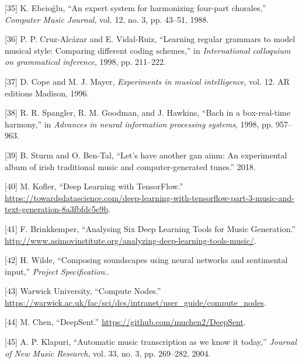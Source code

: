 \documentclass[12pt,]{article}
\begin{document}
\leavevmode\hypertarget{ref-ebciouglu1988expert}{}%
{[}35{]} K. Ebcioğlu, ``An expert system for harmonizing four-part
chorales,'' \emph{Computer Music Journal}, vol. 12, no. 3, pp. 43--51,
1988.

\leavevmode\hypertarget{ref-cruz1998learning}{}%
{[}36{]} P. P. Cruz-Alcázar and E. Vidal-Ruiz, ``Learning regular
grammars to model musical style: Comparing different coding schemes,''
in \emph{International colloquium on grammatical inference}, 1998, pp.
211--222.

\leavevmode\hypertarget{ref-cope1996experiments}{}%
{[}37{]} D. Cope and M. J. Mayer, \emph{Experiments in musical
intelligence}, vol. 12. AR editions Madison, 1996.

\leavevmode\hypertarget{ref-spangler1998bach}{}%
{[}38{]} R. R. Spangler, R. M. Goodman, and J. Hawkins, ``Bach in a
box-real-time harmony,'' in \emph{Advances in neural information
processing systems}, 1998, pp. 957--963.

\leavevmode\hypertarget{ref-sturm2018let}{}%
{[}39{]} B. Sturm and O. Ben-Tal, ``Let's have another gan ainm: An
experimental album of irish traditional music and computer-generated
tunes.'' 2018.

\leavevmode\hypertarget{ref-mkofler}{}%
{[}40{]} M. Kofler, ``Deep Learning with TensorFlow.'' \\
\url{https://towardsdatascience.com/deep-learning-with-tensorflow-part-3-music-and-text-generation-8a3fbfdc5e9b}.

\leavevmode\hypertarget{ref-asimovinst}{}%
{[}41{]} F. Brinkkemper, ``Analysing Six Deep Learning Tools for Music
Generation.'' \\
\url{http://www.asimovinstitute.org/analyzing-deep-learning-tools-music/}.

\leavevmode\hypertarget{ref-specification}{}%
{[}42{]} H. Wilde, ``Composing soundscapes using neural networks and
sentimental input,'' \emph{Project Specification}..

\leavevmode\hypertarget{ref-warwickcomputenodes}{}%
{[}43{]} \relax Warwick University, ``Compute Nodes.'' \\
\url{https://warwick.ac.uk/fac/sci/dcs/intranet/user_guide/compute_nodes}.

\leavevmode\hypertarget{ref-deepsent}{}%
{[}44{]} M. Chen, ``DeepSent.''
\url{https://github.com/muchen2/DeepSent}.

\leavevmode\hypertarget{ref-klapuri2004automatic}{}%
{[}45{]} A. P. Klapuri, ``Automatic music transcription as we know it
today,'' \emph{Journal of New Music Research}, vol. 33, no. 3, pp.
269--282, 2004.
\end{document}
